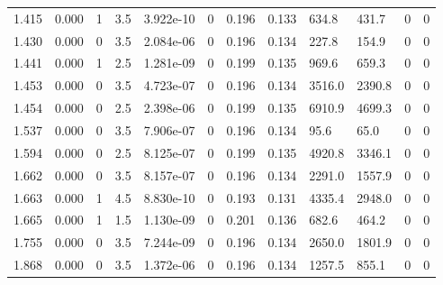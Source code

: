 \documentclass[preview]{standalone}
\begin{document}
{{\begin{tabular}{L{1.2cm}C{1.2cm} C{0.3cm}C{0.5cm} C{1.4cm}C{1.4cm} C{1.4cm}C{1.4cm} C{1.6cm}C{1.6cm} C{1.6cm}C{1.6cm}}
  1.415  &  0.000  & 1     & 3.5 &  3.922e-10  & 0  &  0.196&   0.133& 634.8 & 431.7   &  0 & 0  \\ 
  1.430  &  0.000  & 0     & 3.5 &  2.084e-06  & 0  &  0.196&   0.134& 227.8 & 154.9   &  0 & 0  \\ 
  1.441  &  0.000  & 1     & 2.5 &  1.281e-09  & 0  &  0.199&   0.135& 969.6 & 659.3   &  0 & 0  \\ 
  1.453  &  0.000  & 0     & 3.5 &  4.723e-07  & 0  &  0.196&   0.134& 3516.0 & 2390.8   &  0 & 0  \\ 
  1.454  &  0.000  & 0     & 2.5 &  2.398e-06  & 0  &  0.199&   0.135& 6910.9 & 4699.3   &  0 & 0  \\ 
  1.537  &  0.000  & 0     & 3.5 &  7.906e-07  & 0  &  0.196&   0.134& 95.6 & 65.0   &  0 & 0  \\ 
  1.594  &  0.000  & 0     & 2.5 &  8.125e-07  & 0  &  0.199&   0.135& 4920.8 & 3346.1   &  0 & 0  \\ 
  1.662  &  0.000  & 0     & 3.5 &  8.157e-07  & 0  &  0.196&   0.134& 2291.0 & 1557.9   &  0 & 0  \\ 
  1.663  &  0.000  & 1     & 4.5 &  8.830e-10  & 0  &  0.193&   0.131& 4335.4 & 2948.0   &  0 & 0  \\ 
  1.665  &  0.000  & 1     & 1.5 &  1.130e-09  & 0  &  0.201&   0.136& 682.6 & 464.2   &  0 & 0  \\ 
  1.755  &  0.000  & 0     & 3.5 &  7.244e-09  & 0  &  0.196&   0.134& 2650.0 & 1801.9   &  0 & 0  \\ 
  1.868  &  0.000  & 0     & 3.5 &  1.372e-06  & 0  &  0.196&   0.134& 1257.5 & 855.1   &  0 & 0  \\ 
\hline 
\end{tabular} 

}}
\end{document}
